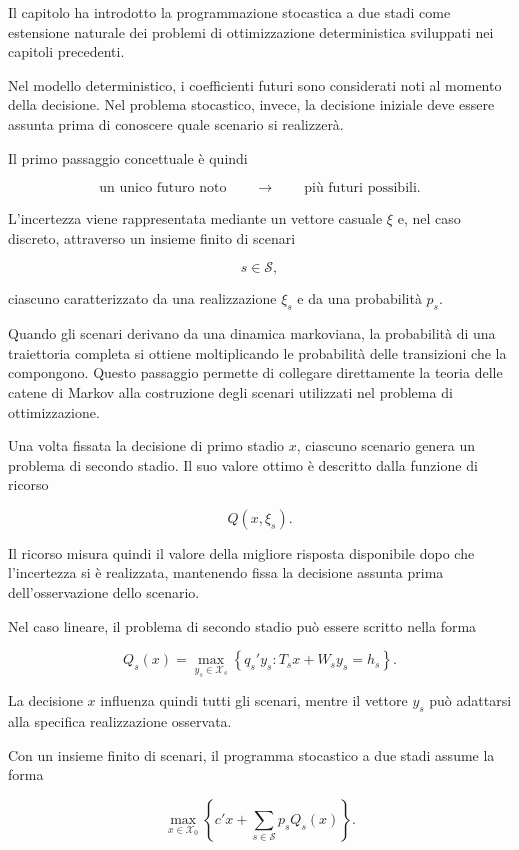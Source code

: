 Il capitolo ha introdotto la programmazione stocastica a due stadi come
estensione naturale dei problemi di ottimizzazione deterministica sviluppati
nei capitoli precedenti.

Nel modello deterministico, i coefficienti futuri sono considerati noti al
momento della decisione. Nel problema stocastico, invece, la decisione iniziale
deve essere assunta prima di conoscere quale scenario si realizzer\`a.

Il primo passaggio concettuale \`e quindi

\[
\text{un unico futuro noto}
\qquad\longrightarrow\qquad
\text{pi\`u futuri possibili}.
\]

L'incertezza viene rappresentata mediante un vettore casuale $\xi$ e,
nel caso discreto, attraverso un insieme finito di scenari

\[
s\in\mathcal S,
\]

\noindent ciascuno caratterizzato da una realizzazione $\xi_s$ e da una probabilit\`a
$p_s$.

Quando gli scenari derivano da una dinamica markoviana, la probabilit\`a di
una traiettoria completa si ottiene moltiplicando le probabilit\`a delle
transizioni che la compongono. Questo passaggio permette di collegare
direttamente la teoria delle catene di Markov alla costruzione degli scenari
utilizzati nel problema di ottimizzazione.

Una volta fissata la decisione di primo stadio $x$, ciascuno scenario genera
un problema di secondo stadio. Il suo valore ottimo \`e descritto dalla
funzione di ricorso

\[
Q(x,\xi_s).
\]

Il ricorso misura quindi il valore della migliore risposta disponibile dopo
che l'incertezza si \`e realizzata, mantenendo fissa la decisione assunta prima
dell'osservazione dello scenario.

Nel caso lineare, il problema di secondo stadio pu\`o essere scritto nella
forma

\[
Q_s(x)
=
\max_{y_s\in\mathcal X_s}
\left\{
q_s'y_s:
T_sx+W_sy_s=h_s
\right\}.
\]

La decisione $x$ influenza quindi tutti gli scenari, mentre il vettore $y_s$
pu\`o adattarsi alla specifica realizzazione osservata.

Con un insieme finito di scenari, il programma stocastico a due stadi assume
la forma

\[
\max_{x\in\mathcal X_0}
\left\{
c'x
+
\sum_{s\in\mathcal S}
p_sQ_s(x)
\right\}.
\]


